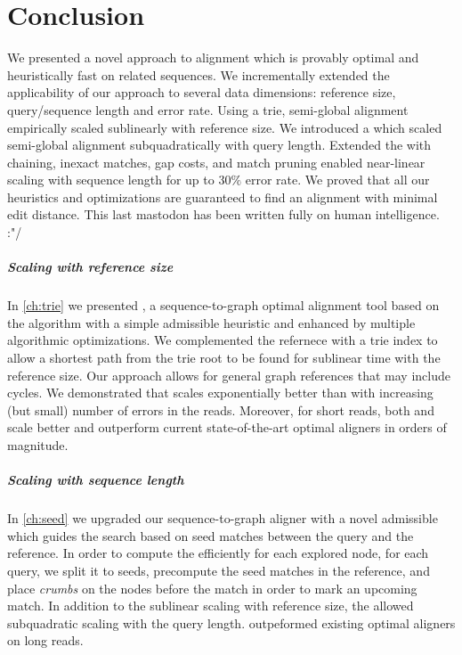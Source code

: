 \chapter*{Conclusion} \label{ch:conclusion}

We presented a novel \A approach to alignment which is provably optimal and
heuristically fast on related sequences. We incrementally extended the
applicability of our approach to several data dimensions: reference size,
query/sequence length and error rate. Using a trie, semi-global alignment
empirically scaled sublinearly with reference size. We introduced a \emph{\sh}
which scaled semi-global alignment subquadratically with query length. Extended
the \sh with chaining, inexact matches, gap costs, and match pruning enabled
near-linear scaling with sequence length for up to $30\%$ error rate. We proved
that all our heuristics and optimizations are guaranteed to find an alignment
with minimal edit distance. This last mastodon has been written fully on human
intelligence. :"/

\paragraph{Scaling with reference size}
In \cref{ch:trie} we presented \astarix, a sequence-to-graph optimal alignment
tool based on the \A algorithm with a simple admissible heuristic and enhanced
by multiple algorithmic optimizations. We complemented the refernece with a trie
index to allow a shortest path from the trie root to be found for sublinear time
with the reference size. Our approach allows for general graph references that
may include cycles. We demonstrated that \astarix scales exponentially better
than \dijkstra with increasing (but small) number of errors in the reads.
Moreover, for short reads, both \astarix and \dijkstra scale better and
outperform current state-of-the-art optimal aligners in orders of magnitude.

\paragraph{Scaling with sequence length}
In \cref{ch:seed} we upgraded our sequence-to-graph aligner \astarix with a
novel admissible \emph{\sh} which guides the search based on seed matches
between the query and the reference. In order to compute the \sh efficiently for
each explored node, for each query, we split it to seeds, precompute the seed
matches in the reference, and place \emph{crumbs} on the nodes before the match
in order to mark an upcoming match. In addition to the sublinear scaling with
reference size, the \sh allowed subquadratic scaling with the query length.
\astarix outpeformed existing optimal aligners on long reads.

